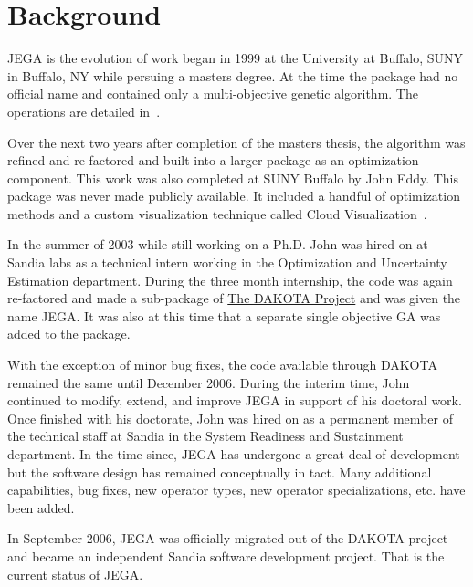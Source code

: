 \chapter{Background} \label{ch:background}

JEGA is the evolution of work began in 1999 at the University at
Buffalo, SUNY in Buffalo, NY while persuing a masters degree.  At
the time the package had no official name and contained only a
multi-objective genetic algorithm.  The operations are detailed
in~\cite{eddy:ms:2001}.

Over the next two years after completion of the masters thesis, the
algorithm was refined and re-factored and built into a larger
package as an optimization component.  This work was also completed
at SUNY Buffalo by John Eddy.  This package was never made publicly
available. It included a handful of optimization methods and a
custom visualization technique called Cloud
Visualization~\cite{eddy:cloud_visualization:2002}.

In the summer of 2003 while still working on a Ph.D. John was hired
on at Sandia labs as a technical intern working in the Optimization
and Uncertainty Estimation department.  During the three month
internship, the code was again re-factored and made a sub-package of
\href{http://dakota.sandia.gov}{The DAKOTA Project}
and was given the name JEGA. It was also at this time that a
separate single objective GA was added to the package.

With the exception of minor bug fixes, the code available through
DAKOTA remained the same until December 2006. During the interim
time, John continued to modify, extend, and improve JEGA in support
of his doctoral work.  Once finished with his doctorate, John was
hired on as a permanent member of the technical staff at Sandia in
the System Readiness and Sustainment department.  In the time since,
JEGA has undergone a great deal of development but the software
design has remained conceptually in tact.  Many additional
capabilities, bug fixes, new operator types, new operator
specializations, etc. have been added.

In September 2006, JEGA was officially migrated out of the DAKOTA
project and became an independent Sandia software development
project.  That is the current status of JEGA.
